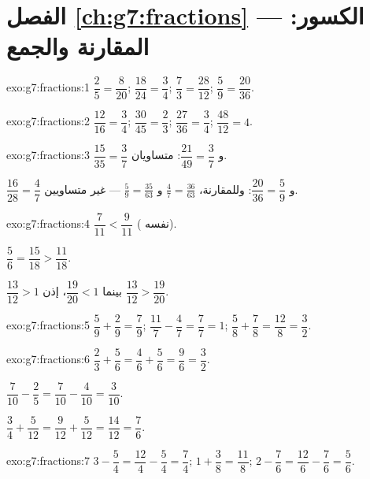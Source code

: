 \section*{الفصل \ref{ch:g7:fractions} --- الكسور: المقارنة والجمع}

\begin{solution}{exo:g7:fractions:1}
$\dfrac{2}{5} = \dfrac{8}{20}$; \quad
$\dfrac{18}{24} = \dfrac{3}{4}$; \quad
$\dfrac{7}{3} = \dfrac{28}{12}$; \quad
$\dfrac{5}{9} = \dfrac{20}{36}$.
\end{solution}

\begin{solution}{exo:g7:fractions:2}
$\dfrac{12}{16} = \dfrac34$; \quad
$\dfrac{30}{45} = \dfrac23$; \quad
$\dfrac{27}{36} = \dfrac34$; \quad
$\dfrac{48}{12} = 4$.
\end{solution}

\begin{solution}{exo:g7:fractions:3}
$\dfrac{15}{35} = \dfrac37$ و $\dfrac{21}{49} = \dfrac37$: متساويان.

$\dfrac{16}{28} = \dfrac47$ و $\dfrac{20}{36} = \dfrac59$: وللمقارنة،
$\frac47 = \frac{36}{63}$ و $\frac59 = \frac{35}{63}$ ---
غير متساويين.
\end{solution}

\begin{solution}{exo:g7:fractions:4}
$\dfrac{7}{11} < \dfrac{9}{11}$ ( نفسه).

$\dfrac56 = \dfrac{15}{18} > \dfrac{11}{18}$.

$\dfrac{13}{12} > 1$ بينما $\dfrac{19}{20} < 1$، إذن
$\dfrac{13}{12} > \dfrac{19}{20}$.
\end{solution}

\begin{solution}{exo:g7:fractions:5}
$\dfrac59 + \dfrac29 = \dfrac79$; \quad
$\dfrac{11}{7} - \dfrac47 = \dfrac77 = 1$; \quad
$\dfrac58 + \dfrac78 = \dfrac{12}{8} = \dfrac32$.
\end{solution}

\begin{solution}{exo:g7:fractions:6}
$\dfrac23 + \dfrac56 = \dfrac46 + \dfrac56 = \dfrac96 = \dfrac32$.

$\dfrac{7}{10} - \dfrac25 = \dfrac{7}{10} - \dfrac{4}{10} =
\dfrac{3}{10}$.

$\dfrac34 + \dfrac{5}{12} = \dfrac{9}{12} + \dfrac{5}{12} =
\dfrac{14}{12} = \dfrac76$.
\end{solution}

\begin{solution}{exo:g7:fractions:7}
$3 - \dfrac54 = \dfrac{12}{4} - \dfrac54 = \dfrac74$; \quad
$1 + \dfrac38 = \dfrac{11}{8}$; \quad
$2 - \dfrac76 = \dfrac{12}{6} - \dfrac76 = \dfrac56$.
\end{solution}

